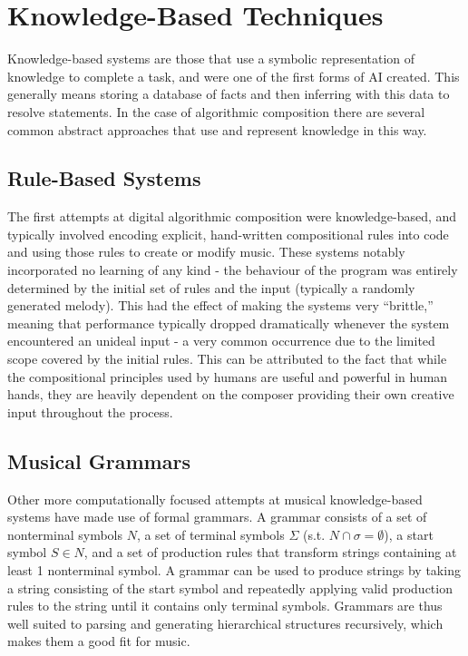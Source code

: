 \documentclass[ author={Stephen Livermore-Tozer},
				supervisor={Dr. Peter Flach},
				degree={MEng},
				title={Performing Algorithmic Co-composition Using Machine Learning},
				subtitle={},
				type={research},
				year={2016} ]{dissertation}
\begin{document}
	\section{Knowledge-Based Techniques}
	
	Knowledge-based systems are those that use a symbolic representation of knowledge to complete a task, and were one of the first forms of AI created. This generally means storing a database of facts and then inferring with this data to resolve statements. In the case of algorithmic composition there are several common abstract approaches that use and represent knowledge in this way. 
	
	\subsection{Rule-Based Systems}
	
	The first attempts at digital algorithmic composition were knowledge-based, and typically involved encoding explicit, hand-written compositional rules into code and using those rules to create or modify music. These systems notably incorporated no learning of any kind - the behaviour of the program was entirely determined by the initial set of rules and the input (typically a randomly generated melody). This had the effect of making the systems very ``brittle,'' meaning that performance typically dropped dramatically whenever the system encountered an unideal input - a very common occurrence due to the limited scope covered by the initial rules. This can be attributed to the fact that while the compositional principles used by humans are useful and powerful in human hands, they are heavily dependent on the composer providing their own creative input throughout the process.
	
	\subsection{Musical Grammars}
	
	Other more computationally focused attempts at musical knowledge-based systems have made use of formal grammars. A grammar consists of a set of nonterminal symbols $N$, a set of terminal symbols $\Sigma$ (s.t. $N \cap \sigma = \emptyset$), a start symbol $S \in N$, and a set of production rules that transform strings containing at least 1 nonterminal symbol. A grammar can be used to produce strings by taking a string consisting of the start symbol and repeatedly applying valid production rules to the string until it contains only terminal symbols. Grammars are thus well suited to parsing and generating hierarchical structures recursively, which makes them a good fit for music. 
	
\end{document}

